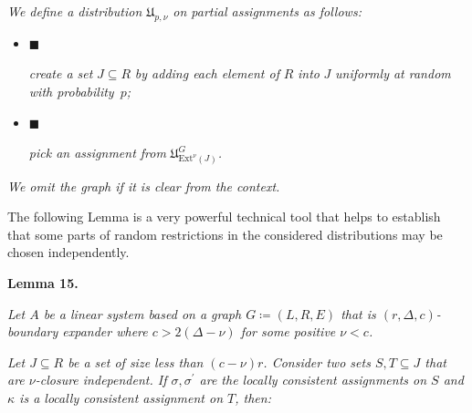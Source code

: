 \documentclass[10pt,a4paper]{article}
\begin{document}
\emph{We define a distribution $\mathfrak{U}_{p,\nu}$ on partial assignments as follows:}\par


\begin{itemize}


\item[] 
$\blacksquare$ 


\emph{create a set }$J\subseteq R$\emph{ by adding each element of }$R$\emph{ into }$J$\emph{ uniformly at random
with probability }$p$\emph{;}\par





\item[] 
$\blacksquare$ 


\emph{pick an assignment from }$\mathfrak{U}^{G}_{\mathrm{Ext}^{\nu}\left(J\right)}$\emph{.}\par





\end{itemize}




\emph{We omit the graph if it is clear from the context.}\par






The following Lemma is a very powerful technical tool that helps to establish that some parts of random
restrictions in the considered distributions may be chosen independently.\par





\par\medskip\noindent\textbf{
\textbf{Lemma 15}\textbf{.}
}\par



\emph{Let $A$ be a linear system based on a graph $G\coloneqq(L,R,E)$ that is $(r,\Delta,c)$-boundary expander where $c>2(\Delta-\nu)$ for some positive $\nu<c$.}\par




\emph{Let $J\subseteq R$ be a set of size less than $(c-\nu)r$. Consider two sets $S,T\subseteq J$ that
are $\nu$-closure independent. If $\sigma,\sigma^{\prime}$ are the locally consistent assignments on $S$ and
$\kappa$ is a locally consistent assignment on $T$, then:}\par
\end{document}

